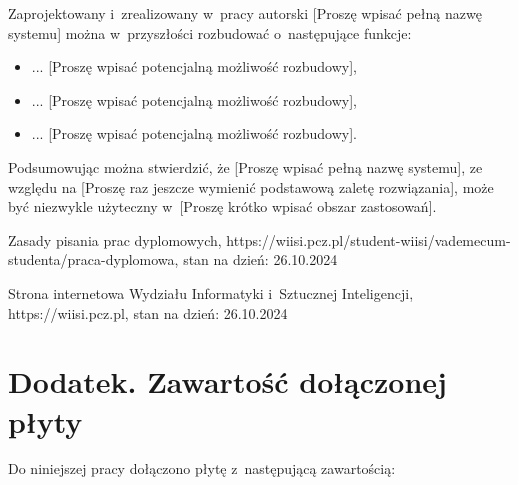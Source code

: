 \documentclass{PracaDyplomowa}
\begin{document}
Zaprojektowany i~zrealizowany w~pracy autorski [Proszę wpisać pełną nazwę systemu] można w~przyszłości rozbudować o~następujące funkcje:

\begin{itemize}
\item ... [Proszę wpisać potencjalną możliwość rozbudowy],
\item ... [Proszę wpisać potencjalną możliwość rozbudowy],
\item ... [Proszę wpisać potencjalną możliwość rozbudowy].
\end{itemize}

Podsumowując można stwierdzić, że [Proszę wpisać pełną nazwę systemu], ze względu na [Proszę raz jeszcze wymienić podstawową zaletę rozwiązania], może być niezwykle użyteczny w~[Proszę krótko wpisać obszar zastosowań].

\cleardoublepage
\begin{thebibliography}{99}


 Zasady pisania prac dyplomowych, https://wiisi.pcz.pl/student-wiisi/vademecum-studenta/praca-dyplomowa, stan na dzień: 26.10.2024

 Strona internetowa Wydziału Informatyki i~Sztucznej Inteligencji, https://wiisi.pcz.pl, stan na dzień: 26.10.2024

\end{thebibliography}

\chapter*{Dodatek. Zawartość dołączonej płyty}

Do niniejszej pracy dołączono płytę z~następującą zawartością:
\end{document}
